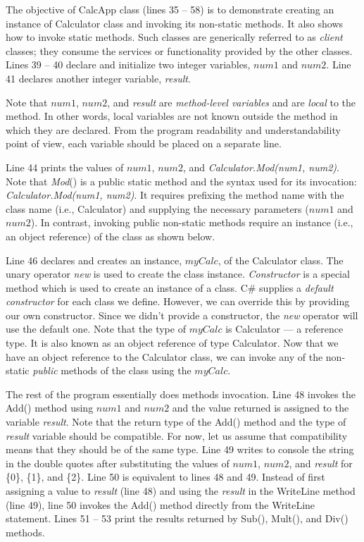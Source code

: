 The objective of CalcApp class (lines 35 -- 58) is to demonstrate
creating an instance of Calculator class and invoking its
non-static methods. It also shows how to invoke static methods.
Such classes are generically referred to as \emph{client} classes;
they consume the services or functionality provided by the other
classes. Lines 39 -- 40 declare and initialize two integer
variables, $num1$ and $num2$. Line 41 declares another integer
variable, \emph{result}.


Note that $num1$, $num2$, and \emph{result} are \emph{method-level
variables} and are \emph{local} to the method. In other words,
local variables are not known outside the method in which they are
declared. From the program readability and understandability point
of view, each variable should be placed on a separate line.


Line 44 prints the values of $num1$, $num2$, and
\emph{Calculator.Mod(num1, num2)}. Note that \emph{Mod}() is a
public static method and the syntax used for its invocation:
\emph{Calculator.Mod(num1, num2)}. It requires prefixing the
method name with the class name (i.e., Calculator) and supplying
the necessary parameters ($num1$ and $num2$). In contrast,
invoking public non-static methods require an instance (i.e., an
object reference) of the class as shown below.


Line 46 declares and creates an instance, $myCalc$, of the
Calculator class. The unary operator \emph{new} is used to create
the class instance. \emph{Constructor} is a special method which
is used to create an instance of a class. C\# supplies a
\emph{default constructor} for each class we define. However, we
can override this by providing our own constructor. Since we
didn't provide a constructor, the \emph{new} operator will use the
default one. Note that the type of $myCalc$ is Calculator --- a
reference type. It is also known as an object reference of type
Calculator. Now that we have an object reference to the Calculator
class, we can invoke any of the non-static \emph{public} methods
of the class using the $myCalc$.


The rest of the program essentially does methods invocation. Line
48 invokes the Add() method using $num1$ and $num2$ and the value
returned is assigned to the variable \emph{result}. Note that the
return type of the Add() method and the type of \emph{result}
variable should be compatible. For now, let us assume that
compatibility means that they should be of the same type. Line 49
writes to console the string in the double quotes after
substituting the values of $num1$, $num2$, and \emph{result} for
\{0\}, \{1\}, and \{2\}. Line 50 is equivalent to lines 48 and 49.
Instead of first assigning a value to \emph{result} (line 48) and
using the \emph{result} in the WriteLine method (line 49), line 50
invokes the Add() method directly from the WriteLine statement.
Lines 51 -- 53 print the results returned by Sub(), Mult(), and
Div() methods.

